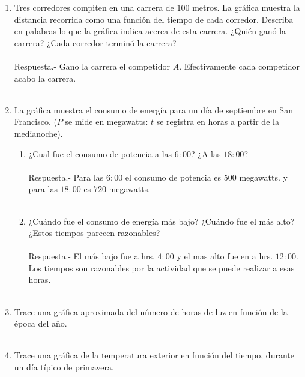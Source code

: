 \begin{enumerate}
    \item Tres corredores compiten en una carrera de $100$ metros. La gráfica muestra la distancia recorrida como una función del tiempo de cada corredor. Describa en palabras lo que la gráfica indica acerca de esta carrera. ¿Quién ganó la carrera? ¿Cada corredor terminó la carrera?\\\\
    Respuesta.-\; Gano la carrera el competidor $A$. Efectivamente cada competidor acabo la carrera.\\\\ 

    \item La gráfica muestra el consumo de energía para un día de septiembre en San Francisco. ($P$ se mide en megawatts: $t$ se registra en horas a partir de la medianoche).

	\begin{enumerate}[\bfseries (a)]

	    \item ¿Cual fue el consumo de potencia a las $6:00$? ¿A las $18:00$?\\\\
	    Respuesta.-\; Para las $6:00$ el consumo de potencia es $500$ megawatts. y para las $18:00$ es $720$ megawatts.\\\\

	    \item ¿Cuándo fue el consumo de energía más bajo? ¿Cuándo fue el más alto? ¿Estos tiempos parecen razonables?\\\\
	    Respuesta.-\; El más bajo fue a hrs. $4:00$ y el mas alto fue en a hrs. $12:00$. Los tiempos son razonables por la actividad que se puede realizar a esas horas.\\\\

	\end{enumerate}

    \item Trace una gráfica aproximada del número de horas de luz en función de la época del año.\\\\

    \item Trace una gráfica de la temperatura exterior en función del tiempo, durante un día típico de primavera.\\\\


\end{enumerate}
